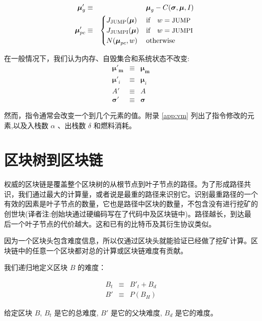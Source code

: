 \documentclass[9pt,oneside]{amsart}
\begin{document}
\begin{multicols}{2}
\begin{eqnarray}
\quad \boldsymbol{\mu}'_{g} & \equiv & \boldsymbol{\mu}_{g} - C(\boldsymbol{\sigma}, \boldsymbol{\mu}, I) \\
\quad \boldsymbol{\mu}'_{pc} & \equiv & \begin{cases}
J_{\text{JUMP}}(\boldsymbol{\mu}) & \text{if} \quad w = \text{\small JUMP} \\
J_{\text{JUMPI}}(\boldsymbol{\mu}) & \text{if} \quad w = \text{\small JUMPI} \\
N(\boldsymbol{\mu}_{pc}, w) & \text{otherwise}
\end{cases}
\end{eqnarray}

在一般情况下，我们认为内存、自毁集合和系统状态不改变:
\begin{eqnarray}
\boldsymbol{\mu}'_\mathbf{m} & \equiv & \boldsymbol{\mu}_\mathbf{m} \\
\boldsymbol{\mu}'_i & \equiv & \boldsymbol{\mu}_i \\
A' & \equiv & A \\
\boldsymbol{\sigma}' & \equiv & \boldsymbol{\sigma}
\end{eqnarray}


然而，指令通常会改变一个到几个元素的值。附录 \ref{app:vm} 列出了指令修改的元素,以及入栈数 $\alpha$ 、出栈数 $\delta$ 和燃料消耗。

\section{区块树到区块链} \label{ch:ghost}

权威的区块链是覆盖整个区块树的从根节点到叶子节点的路径。为了形成路径共识，我们通过最大的计算量，或者说是最重的路径来识别它。识别最重路径的一个有效的因素是叶子节点的数量，它也是路径中区块的数量，不包含没有进行挖矿的创世块(译者注:创始块通过硬编码写在了代码中及区块链中)。路径越长，到达最后一个叶子节点的代价越大。这和已有的比特币及其衍生协议类似。

因为一个区块头包含难度信息，所以仅通过区块头就能验证已经做了挖矿计算。区块链中的任意一个区块都对总的计算或区块链难度有贡献。

我们递归地定义区块 \hyperlink{block}{$B$} 的难度：

\begin{eqnarray}
B_t & \equiv & B'_t + B_d \\
B' & \equiv & P(B_H)
\end{eqnarray}

给定区块 \hyperlink{block}{$B$}, $B_t$ 是它的总难度, $B'$ 是它的父块难度, $B_d$ 是它的难度。


\end{multicols}
\end{document}
